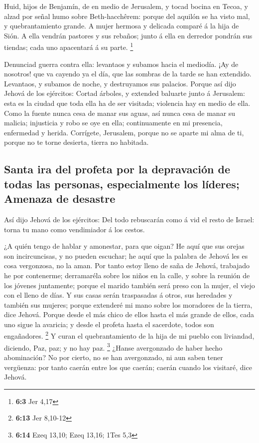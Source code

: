  Huid, hijos de Benjamín, de en medio de Jerusalem, y
tocad bocina en Tecoa, y alzad por señal humo sobre Beth-hacchêrem:
porque del aquilón se ha visto mal, y quebrantamiento grande.
 A mujer hermosa y delicada comparé á la hija de Sión.
 A ella vendrán pastores y sus rebaños; junto á ella en
derredor pondrán sus tiendas; cada uno apacentará á su parte.
\footnote{\textbf{6:3} Jer 4,17}

 Denunciad guerra contra ella: levantaos y subamos hacia
el mediodía. ¡Ay de nosotros! que va cayendo ya el día, que las sombras
de la tarde se han extendido.  Levantaos, y subamos de
noche, y destruyamos sus palacios.  Porque así dijo Jehová
de los ejércitos: Cortad árboles, y extended baluarte junto á Jerusalem:
esta es la ciudad que toda ella ha de ser visitada; violencia hay en
medio de ella.  Como la fuente nunca cesa de manar sus
aguas, así nunca cesa de manar su malicia; injusticia y robo se oye en
ella; continuamente en mi presencia, enfermedad y herida. 
Corrígete, Jerusalem, porque no se aparte mi alma de ti, porque no te
torne desierta, tierra no habitada.

\hypertarget{santa-ira-del-profeta-por-la-depravaciuxf3n-de-todas-las-personas-especialmente-los-luxedderes-amenaza-de-desastre}{%
\subsection{Santa ira del profeta por la depravación de todas las
personas, especialmente los líderes; Amenaza de
desastre}\label{santa-ira-del-profeta-por-la-depravaciuxf3n-de-todas-las-personas-especialmente-los-luxedderes-amenaza-de-desastre}}

 Así dijo Jehová de los ejércitos: Del todo rebuscarán
como á vid el resto de Israel: torna tu mano como vendimiador á los
cestos.

 ¿A quién tengo de hablar y amonestar, para que oigan? He
aquí que sus orejas son incircuncisas, y no pueden escuchar; he aquí que
la palabra de Jehová les es cosa vergonzosa, no la aman. 
Por tanto estoy lleno de saña de Jehová, trabajado he por contenerme;
derramaréla sobre los niños en la calle, y sobre la reunión de los
jóvenes juntamente; porque el marido también será preso con la mujer, el
viejo con el lleno de días.  Y sus casas serán
traspasadas á otros, sus heredades y también sus mujeres; porque
extenderé mi mano sobre los moradores de la tierra, dice Jehová.
 Porque desde el más chico de ellos hasta el más grande
de ellos, cada uno sigue la avaricia; y desde el profeta hasta el
sacerdote, todos son engañadores. \footnote{\textbf{6:13} Jer 8,10-12}
 Y curan el quebrantamiento de la hija de mi pueblo con
liviandad, diciendo, Paz, paz; y no hay paz. \footnote{\textbf{6:14}
  Ezeq 13,10; Ezeq 13,16; 1Tes 5,3}  ¿Hanse avergonzado
de haber hecho abominación? No por cierto, no se han avergonzado, ni aun
saben tener vergüenza: por tanto caerán entre los que caerán; caerán
cuando los visitaré, dice Jehová.

